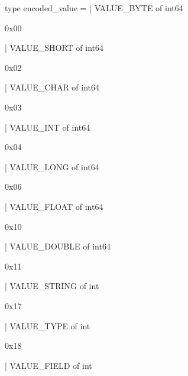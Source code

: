 \documentclass[11pt]{article}
\begin{document}
\label{type:Dex.encoded-underscorevalue}\begin{ocamldoccode}
type encoded_value =
  | VALUE_BYTE of int64
\end{ocamldoccode}
\begin{ocamldoccomment}
0x00
\end{ocamldoccomment}
\begin{ocamldoccode}
  | VALUE_SHORT of int64
\end{ocamldoccode}
\begin{ocamldoccomment}
0x02
\end{ocamldoccomment}
\begin{ocamldoccode}
  | VALUE_CHAR of int64
\end{ocamldoccode}
\begin{ocamldoccomment}
0x03
\end{ocamldoccomment}
\begin{ocamldoccode}
  | VALUE_INT of int64
\end{ocamldoccode}
\begin{ocamldoccomment}
0x04
\end{ocamldoccomment}
\begin{ocamldoccode}
  | VALUE_LONG of int64
\end{ocamldoccode}
\begin{ocamldoccomment}
0x06
\end{ocamldoccomment}
\begin{ocamldoccode}
  | VALUE_FLOAT of int64
\end{ocamldoccode}
\begin{ocamldoccomment}
0x10
\end{ocamldoccomment}
\begin{ocamldoccode}
  | VALUE_DOUBLE of int64
\end{ocamldoccode}
\begin{ocamldoccomment}
0x11
\end{ocamldoccomment}
\begin{ocamldoccode}
  | VALUE_STRING of int
\end{ocamldoccode}
\begin{ocamldoccomment}
0x17
\end{ocamldoccomment}
\begin{ocamldoccode}
  | VALUE_TYPE of int
\end{ocamldoccode}
\begin{ocamldoccomment}
0x18
\end{ocamldoccomment}
\begin{ocamldoccode}
  | VALUE_FIELD of int
\end{ocamldoccode}
\end{document}
